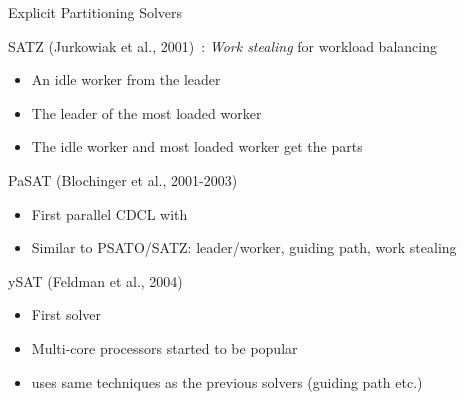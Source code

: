 \documentclass[t,english]{sdqbeamer}
\begin{document}
\begin{frame}{Explicit Partitioning Solvers}
	
	\begin{blueblock}{{SATZ} (Jurkowiak et al., 2001)~\cite{jurkowiak2001parallelizing}: \emph{Work stealing} for workload balancing}
		\begin{itemize}
			\item An idle worker  from the leader
			\item The leader  of the most loaded worker
			\item The idle worker and most loaded worker get the parts
		\end{itemize}
	\end{blueblock}
	\begin{blueblock}{PaSAT (Blochinger et al., 2001-2003)~\cite{blochinger2003parallel}} 
		\begin{itemize}
			\item First parallel CDCL with 
			\item Similar to PSATO/SATZ: leader/worker, guiding path, work stealing
		\end{itemize}
	\end{blueblock}
	\begin{blueblock}{ySAT (Feldman et al., 2004)~\cite{feldman2005parallel}}
		\begin{itemize}
			\item First  solver
			\item Multi-core processors started to be popular
			\item uses same techniques as the previous solvers (guiding path etc.)
		\end{itemize}
	\end{blueblock}\textbf{}
\end{frame}


\end{document}
